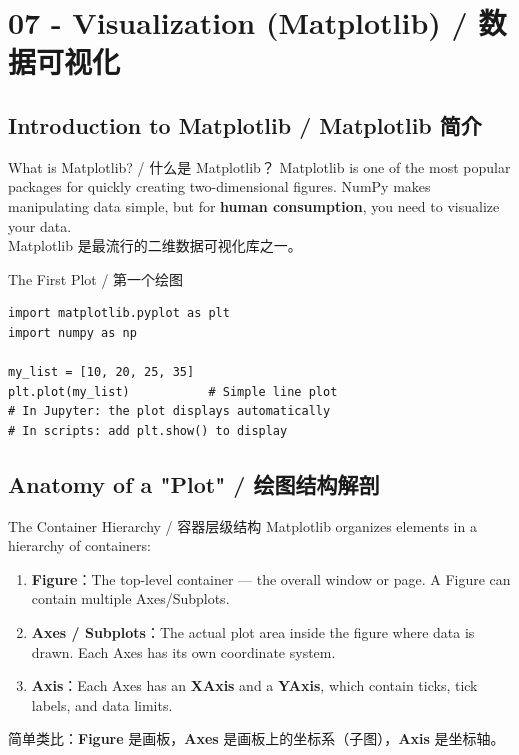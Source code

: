 \documentclass[11pt,a4paper]{report}
\begin{document}
\chapter{07 - Visualization (Matplotlib) / 数据可视化}



\section{Introduction to Matplotlib / Matplotlib 简介}

\begin{concept}{What is Matplotlib? / 什么是 Matplotlib？}
    Matplotlib is one of the most popular packages for quickly creating two-dimensional figures. NumPy makes manipulating data simple, but for \textbf{human consumption}, you need to visualize your data. \\
    Matplotlib 是最流行的二维数据可视化库之一。
\end{concept}

\begin{examplebox}{The First Plot / 第一个绘图}
\begin{lstlisting}
import matplotlib.pyplot as plt
import numpy as np

my_list = [10, 20, 25, 35]
plt.plot(my_list)           # Simple line plot
# In Jupyter: the plot displays automatically
# In scripts: add plt.show() to display
\end{lstlisting}
\end{examplebox}

\section{Anatomy of a "Plot" / 绘图结构解剖}

\begin{concept}{The Container Hierarchy / 容器层级结构}
    Matplotlib organizes elements in a hierarchy of containers:
    \begin{enumerate}[itemsep=0.5em]
        \item \textbf{Figure}：The top-level container — the overall window or page. A Figure can contain multiple Axes/Subplots.
        \item \textbf{Axes / Subplots}：The actual plot area inside the figure where data is drawn. Each Axes has its own coordinate system.
        \item \textbf{Axis}：Each Axes has an \textbf{XAxis} and a \textbf{YAxis}, which contain ticks, tick labels, and data limits.
    \end{enumerate}
    简单类比：\textbf{Figure} 是画板，\textbf{Axes} 是画板上的坐标系（子图），\textbf{Axis} 是坐标轴。
\end{concept}
\end{document}
